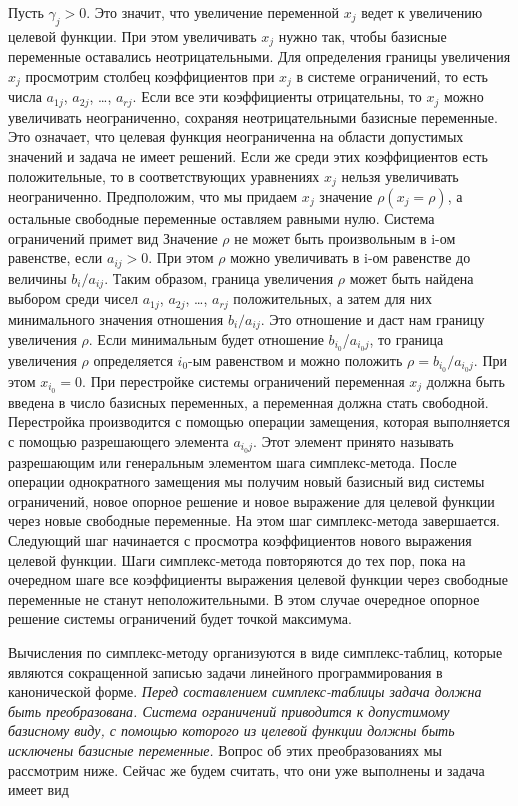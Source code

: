 \documentclass{article}
\begin{document}
Пусть $\gamma_j > 0$. Это значит, что увеличение переменной $x_j$ ведет к увеличению целевой функции. При этом увеличивать $x_j$ нужно так, чтобы базисные переменные оставались неотрицательными. Для определения границы увеличения $x_j$ просмотрим столбец коэффициентов при $x_j$ в системе ограничений, то есть числа
$a_{1j}$, $a_{2j}$, \dots, $a_{rj}$. Если все эти коэффициенты отрицательны, то $x_j$ можно увеличивать неограниченно, сохраняя неотрицательными базисные переменные. Это означает, что целевая функция неограниченна на области допустимых значений и задача не имеет решений. Если же среди этих коэффициентов есть положительные, то в соответствующих уравнениях $x_j$ нельзя увеличивать неограниченно. Предположим, что мы придаем $x_j$ значение $\rho  (x_j = \rho)$, а остальные свободные переменные оставляем равными нулю. Система ограничений примет вид
Значение $\rho$ не может быть произвольным в i-ом равенстве, если $a_{ij}>0$. При этом $\rho$ можно увеличивать в i-ом равенстве до величины $b_i/a_{ij}$. Таким образом, граница увеличения $\rho$ может быть найдена выбором среди чисел $a_{1j}$, $a_{2j}$, \dots, $a_{rj}$ положительных, а затем для них минимального значения отношения $b_i/a_{ij}$. Это отношение и даст нам границу увеличения $\rho$. Если минимальным будет отношение $b_{i_0}$/$a_{i_0j}$, то граница увеличения $\rho$ определяется $i_0$-ым равенством и можно положить $\rho = b_{i_0}/a_{i_0j}$. При этом $x_{i_0} = 0$.  При перестройке системы ограничений переменная $x_j$ должна быть введена в число базисных переменных, а переменная  должна стать свободной. Перестройка производится с помощью операции замещения, которая выполняется с помощью разрешающего элемента $a_{i_0j}$. Этот элемент принято называть разрешающим или генеральным элементом шага симплекс-метода. После операции однократного замещения мы получим новый базисный вид системы ограничений, новое опорное решение и новое выражение для целевой функции через новые свободные переменные. На этом шаг симплекс-метода завершается. Следующий шаг начинается с просмотра коэффициентов нового выражения целевой функции. Шаги симплекс-метода повторяются до тех пор, пока на очередном шаге все коэффициенты выражения целевой функции через свободные переменные не станут неположительными. В этом случае очередное опорное решение системы ограничений будет точкой максимума.

Вычисления по симплекс-методу организуются в виде симплекс-таблиц, которые являются сокращенной записью задачи линейного программирования в канонической форме. \textit{Перед составлением симплекс-таблицы задача должна быть преобразована. Система ограничений приводится к допустимому базисному виду, с помощью которого из целевой функции должны быть исключены базисные  переменные.} Вопрос об этих преобразованиях мы рассмотрим ниже. Сейчас же будем считать, что они уже выполнены и задача имеет вид
\end{document}
